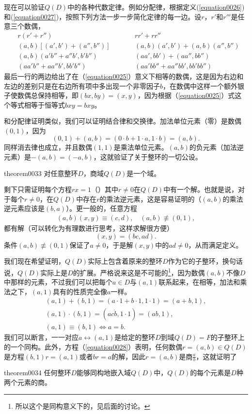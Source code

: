 现在可以验证$Q(D)$中的各种代数定律。例如分配律，根据定义(\ref{equation0026})和(\ref{equation0027})，按照下列方法一步一步简化定律的每一边。设$r$，$r'$和$r'''$是任意三个数偶，
\[
\begin{aligned}
&r(r'+r'')\quad  \quad && rr'+rr'' \\
&(a,b)[(a',b')+(a'',b'')] \quad \quad && (a,b)(a',b')+(a,b)(a'',b'') \\
&(a, b)(a'b''+a''b', b'b'') \quad \quad && (aa', bb')+(aa'', bb'')\\
&(aa'b''+aa''b', bb'b'') \quad \quad && (aa'bb''+aa''bb', bb'bb'')
\end{aligned}
\]
最后一行的两边给出了在（\ref{equation0025}）意义下相等的数偶，这是因为右边和左边的差别只是在右边所有项中多出现一个非零因子$b$，在数偶中这样一个额外银子使数偶总保持相等，即$(bx, by)=(x, y)$，因为根据（\ref{equation0025}）式这个等式相等于恒等式$bxy=bxy$。

和分配律证明类似，我们可以证明结合律和交换律。加法单位元素（零）是数偶$(0, 1)$，因为
\[
(0, 1)+(a,b)=(0 \cdot b + 1 \cdot a, 1 \cdot b)=(a, b).
\]
同样消去律也成立，并且数偶$(1,1)$是乘法单位元素。$(a, b)$的负元素（加法逆元素）是$-(a, b) = (-a, b)$，这就验证了关于整环的一切公设。

\begin{theorem}{}{theorem0033}
对任意整环$D$，商域$Q(D)$是一个域。
\end{theorem}
 剩下只需证明每个方程$rx=1$（）其中$r \neq 0$在$Q(D)$中有一个解。也就是说，对于每个$r \neq 0$，在$Q(D)$中存在$r$的乘法逆元素，这是容易证明的（$(a, b)$的乘法逆元素应该是$(b, a)$）。更一般的，任意方程
\begin{gather}
(a, b)(x, y)\equiv(c, d), \quad (a, b)\not\equiv(0, 1),\label{equation0028}
\end{gather}
都有解（可以转化为有理数进行思考，这样求解很方便）
\[
(x, y) = (bc, ad).
\]
条件$(a, b) \not\equiv (0, 1)$保证了$a \neq 0$，于是解$(x, y)$中的$ad \neq 0$，从而满足定义。

我们现在希望证明，$Q(D)$实际上包含着原来的整环$D$作为它的子整环，换句话说，$Q(D)$实际上是$D$的扩展。严格说来这是不可能的\footnote{所以这个是同构意义下的，见后面的讨论。}，因为数偶$(a, b)$不像$D$中那样的元素，不过我们可以把每个$a \in D$与$(a, 1)$联系起来，在相等，加法和乘法之下，$(a, 1)$具有的性质完全像$a$一样。
\begin{gather*}
(a, 1)+(b,1)=(a \cdot 1 + b \cdot 1, 1 \cdot 1) = (a+b,1),\\
(a,1)\cdot(b,1)=(a c\dot b, 1 \cdot 1)=(ab, 1),\\
(a,1)\equiv(b,1) \Leftrightarrow a=b.
\end{gather*}
我们可以断言，一一对应$a \leftrightarrow (a,1)$是给定的整环$D$到域$Q(D)=F$的子整环上的一个同构。此外，方程（\ref{equation0028}）表明，任何数偶$r=(a,b) \in Q(D)$是方程$(b,1)r=(a,1)$或者$br=a$的解，因此$r=(a,b)$是商$\frac{a}{b}$，这就证明了
\begin{theorem}{}{theorem0034}
任何整环$D$能够同构地嵌入域$Q(D)$中，$Q(D)$的每个元素是$D$种两个元素的商。
\end{theorem}

